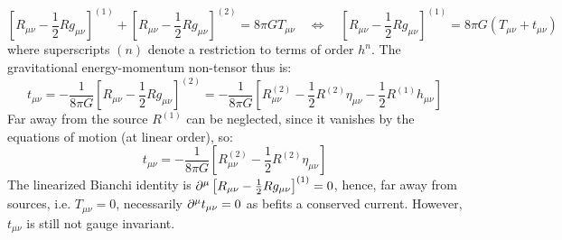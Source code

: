 \begin{equation*}
  \left[ R_{\mu \nu} - \frac{1}{2} R g_{\mu \nu} \right]^{(1)} + \left[ R_{\mu \nu} - \frac{1}{2} R g_{\mu \nu} \right]^{(2)} = 8\pi G T_{\mu \nu}
  \quad \Leftrightarrow \quad
  \left[ R_{\mu \nu} - \frac{1}{2} R g_{\mu \nu} \right]^{(1)} = 8\pi G (T_{\mu \nu} + t_{\mu \nu})
\end{equation*}
where superscripts $ (n) $ denote a restriction to terms of order $ h^n $. The gravitational energy-momentum non-tensor thus is:
\begin{equation*}
  t_{\mu \nu} = - \frac{1}{8\pi G} \left[ R_{\mu \nu} - \frac{1}{2} R g_{\mu \nu} \right]^{(2)} = - \frac{1}{8\pi G} \left[ R^{(2)}_{\mu \nu} - \frac{1}{2} R^{(2)} \eta_{\mu \nu} - \frac{1}{2} R^{(1)} h_{\mu \nu} \right]
\end{equation*}
Far away from the source $ R^{(1)} $ can be neglected, since it vanishes by the equations of motion (at linear order), so:
\begin{equation}
  t_{\mu \nu} = - \frac{1}{8\pi G} \left[ R^{(2)}_{\mu \nu} - \frac{1}{2} R^{(2)} \eta_{\mu \nu} \right]
  \label{eq:5.30}
\end{equation}
The linearized Bianchi identity is $ \partial^\mu \left[ R_{\mu \nu} - \frac{1}{2} R g_{\mu \nu} \right]^{(1)} = 0 $, hence, far away from sources, i.e. $ T_{\mu \nu} = 0 $, necessarily $ \partial^\mu t_{\mu \nu} = 0 $ as befits a conserved current. However, $ t_{\mu \nu} $ is still not gauge invariant.










